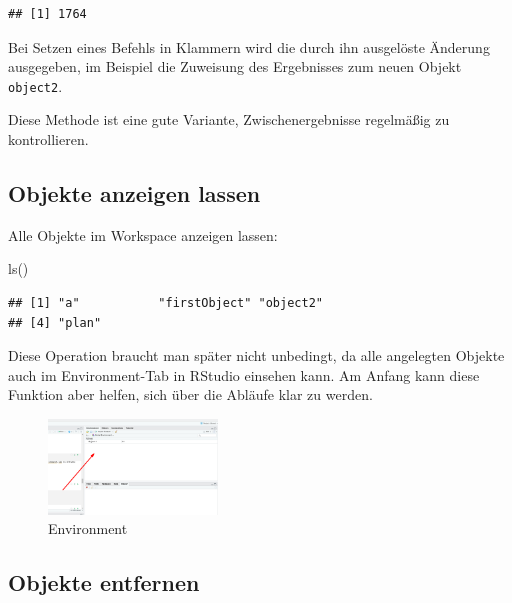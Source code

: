 \documentclass[
]{book}
\newenvironment{Shaded}{\begin{snugshade}}{\end{snugshade}}
\newcommand{\FunctionTok}[1]{\textcolor[rgb]{0.00,0.00,0.00}{#1}}
\newcommand{\NormalTok}[1]{#1}
\begin{document}
\begin{verbatim}
## [1] 1764
\end{verbatim}

Bei Setzen eines Befehls in Klammern wird die durch ihn ausgelöste Änderung ausgegeben, im Beispiel die Zuweisung des Ergebnisses zum neuen Objekt \texttt{object2}.

Diese Methode ist eine gute Variante, Zwischenergebnisse regelmäßig zu kontrollieren.

\hypertarget{objekte-anzeigen-lassen}{%
\subsection*{Objekte anzeigen lassen}\label{objekte-anzeigen-lassen}}

Alle Objekte im Workspace anzeigen lassen:

\begin{Shaded}
\begin{Highlighting}[]
\FunctionTok{ls}\NormalTok{()}
\end{Highlighting}
\end{Shaded}

\begin{verbatim}
## [1] "a"           "firstObject" "object2"    
## [4] "plan"
\end{verbatim}

Diese Operation braucht man später nicht unbedingt, da alle angelegten Objekte auch im Environment-Tab in RStudio einsehen kann. Am Anfang kann diese Funktion aber helfen, sich über die Abläufe klar zu werden.

\begin{figure}
\centering
\includegraphics[width=0.4\textwidth,height=\textheight]{imgs/environment.png}
\caption{Environment}
\end{figure}

\hypertarget{objekte-entfernen}{%
\subsection*{Objekte entfernen}\label{objekte-entfernen}}
\end{document}
